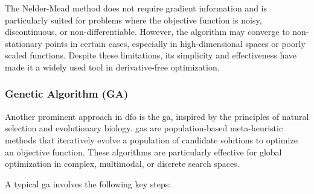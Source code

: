The Nelder-Mead method does not require gradient information and is particularly suited for problems where the objective function is noisy, discontinuous, or non-differentiable. However, the algorithm may converge to non-stationary points in certain cases, especially in high-dimensional spaces or poorly scaled functions. Despite these limitations, its simplicity and effectiveness have made it a widely used tool in derivative-free optimization.

\subsubsection{Genetic Algorithm (GA)}
\label{subsubsection:genetic_algorithm}

Another prominent approach in \ac{dfo} is the \ac{ga}, inspired by the principles of natural selection and evolutionary biology. \acp{ga} are population-based meta-heuristic methods that iteratively evolve a population of candidate solutions to optimize an objective function. These algorithms are particularly effective for global optimization in complex, multimodal, or discrete search spaces.

A typical \ac{ga} involves the following key steps:

